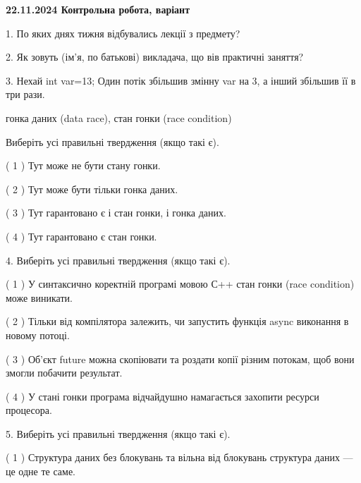 \documentclass[12pt, ukrainian]{article}
\begin{document}
\vspace{4mm}
\newpage
\begin {large}

\textbf{22.11.2024 Контрольна робота, варіант  }\par


{
1. По яких днях тижня відбувались лекції з предмету?



\vspace{5mm}
2. Як зовуть (ім'я, по батькові) викладача, що вів практичні заняття?



\vspace{5mm}
3. Нехай int var=13; Один потік збільшив змінну var на 3, а інший збільшив її в три рази.

гонка даних (data race), стан гонки (race condition)

Виберіть усі правильні твердження (якщо такі є).\par
\vspace{2mm}
( 1 ) Тут може не бути стану гонки.%

( 2 ) Тут може бути тільки гонка даних.%

( 3 ) Тут гарантовано є і стан гонки, і гонка даних.%

( 4 ) Тут гарантовано є стан гонки.%


\vspace{5mm}
4. Виберіть усі правильні твердження (якщо такі є).\par
\vspace{2mm}

( 1 ) У синтаксично коректній програмі мовою С++ стан гонки (race condition) може виникати.%

( 2 ) Тільки від компілятора залежить, чи запустить функція async виконання в новому потоці.%

( 3 ) Об’єкт future можна скопіювати та роздати копії різним потокам, щоб вони змогли побачити результат.%

( 4 ) У стані гонки програма відчайдушно намагається захопити ресурси процесора.%


\vspace{5mm}
5. Виберіть усі правильні твердження (якщо такі є).\par
\vspace{2mm}

( 1 ) Структура даних без блокувань та вільна від блокувань структура даних --- це одне те саме.%

}
\end{large}
\end{document}
